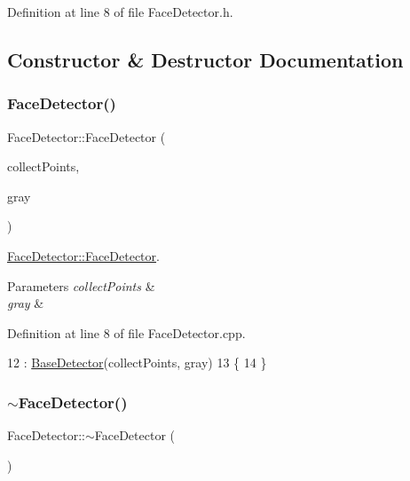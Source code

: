 Definition at line 8 of file Face\+Detector.\+h.



\subsection{Constructor \& Destructor Documentation}
\mbox{\label{class_face_detector_a93e84050cdd04d877cc3a4f404f4ea9c}} 
\subsubsection{\texorpdfstring{Face\+Detector()}{FaceDetector()}}
{\footnotesize\ttfamily Face\+Detector\+::\+Face\+Detector (\begin{DoxyParamCaption}\item[{bool}]{collect\+Points,  }\item[{cv\+::\+U\+Mat \&}]{gray }\end{DoxyParamCaption})}



\mbox{\hyperlink{class_face_detector_a93e84050cdd04d877cc3a4f404f4ea9c}{Face\+Detector\+::\+Face\+Detector}}. 


\begin{DoxyParams}{Parameters}
{\em collect\+Points} & \\
\hline
{\em gray} & \\
\hline
\end{DoxyParams}


Definition at line 8 of file Face\+Detector.\+cpp.


\begin{DoxyCode}
12     : \mbox{\hyperlink{class_base_detector_a3c85e13a47dd472319dc43c60f0d102a}{BaseDetector}}(collectPoints, gray)
13 \{
14 \}
\end{DoxyCode}
\mbox{\label{class_face_detector_abcbd928d55d190c5a9f574c755ac01a6}} 
\subsubsection{\texorpdfstring{$\sim$\+Face\+Detector()}{~FaceDetector()}}
{\footnotesize\ttfamily Face\+Detector\+::$\sim$\+Face\+Detector (\begin{DoxyParamCaption}\item[{void}]{ }\end{DoxyParamCaption})}



